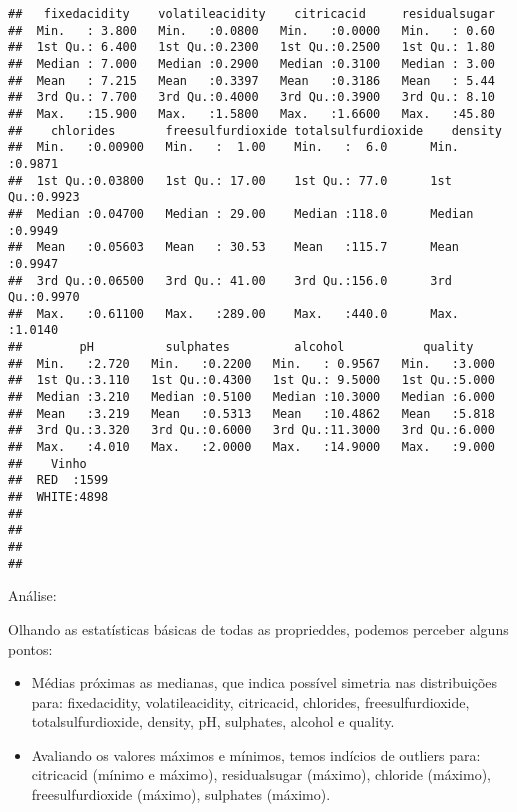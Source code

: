 \documentclass[]{article}
\begin{document}
\begin{verbatim}
##   fixedacidity    volatileacidity    citricacid     residualsugar  
##  Min.   : 3.800   Min.   :0.0800   Min.   :0.0000   Min.   : 0.60  
##  1st Qu.: 6.400   1st Qu.:0.2300   1st Qu.:0.2500   1st Qu.: 1.80  
##  Median : 7.000   Median :0.2900   Median :0.3100   Median : 3.00  
##  Mean   : 7.215   Mean   :0.3397   Mean   :0.3186   Mean   : 5.44  
##  3rd Qu.: 7.700   3rd Qu.:0.4000   3rd Qu.:0.3900   3rd Qu.: 8.10  
##  Max.   :15.900   Max.   :1.5800   Max.   :1.6600   Max.   :45.80  
##    chlorides       freesulfurdioxide totalsulfurdioxide    density      
##  Min.   :0.00900   Min.   :  1.00    Min.   :  6.0      Min.   :0.9871  
##  1st Qu.:0.03800   1st Qu.: 17.00    1st Qu.: 77.0      1st Qu.:0.9923  
##  Median :0.04700   Median : 29.00    Median :118.0      Median :0.9949  
##  Mean   :0.05603   Mean   : 30.53    Mean   :115.7      Mean   :0.9947  
##  3rd Qu.:0.06500   3rd Qu.: 41.00    3rd Qu.:156.0      3rd Qu.:0.9970  
##  Max.   :0.61100   Max.   :289.00    Max.   :440.0      Max.   :1.0140  
##        pH          sulphates         alcohol           quality     
##  Min.   :2.720   Min.   :0.2200   Min.   : 0.9567   Min.   :3.000  
##  1st Qu.:3.110   1st Qu.:0.4300   1st Qu.: 9.5000   1st Qu.:5.000  
##  Median :3.210   Median :0.5100   Median :10.3000   Median :6.000  
##  Mean   :3.219   Mean   :0.5313   Mean   :10.4862   Mean   :5.818  
##  3rd Qu.:3.320   3rd Qu.:0.6000   3rd Qu.:11.3000   3rd Qu.:6.000  
##  Max.   :4.010   Max.   :2.0000   Max.   :14.9000   Max.   :9.000  
##    Vinho     
##  RED  :1599  
##  WHITE:4898  
##              
##              
##              
## 
\end{verbatim}

Análise:

Olhando as estatísticas básicas de todas as proprieddes, podemos
perceber alguns pontos:

\begin{itemize}
\item
  Médias próximas as medianas, que indica possível simetria nas
  distribuições para: fixedacidity, volatileacidity, citricacid,
  chlorides, freesulfurdioxide, totalsulfurdioxide, density, pH,
  sulphates, alcohol e quality.
\item
  Avaliando os valores máximos e mínimos, temos indícios de outliers
  para: citricacid (mínimo e máximo), residualsugar (máximo), chloride
  (máximo), freesulfurdioxide (máximo), sulphates (máximo).
\end{itemize}
\end{document}
